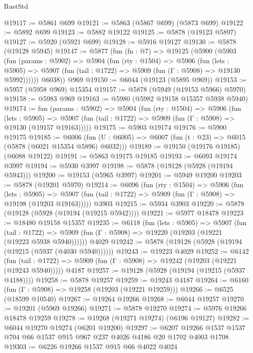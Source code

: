 \begin{lexlean}{RustStd}
\begin{coremodule}
@19117 := @5861 @699
@19121 := @5863 (@5867 @699) (@5873 @699)
@19122 := @5892 @699
@19123 := @5882 @19122
@19125 := @5878 (@19123 @5897)
@19127 := @5920 (@5921 @699)
@19128 := @5916 @19127
@19130 := @5878 (@19128 @5945)
@19147 := @5877
    (fun (fn : @7) =>
    @19125
      (@5900
        (@5903
          (fun (params : @5902) =>
          @5904
            (fun (rty : @1504) =>
            @5906
              (fun (lets : @5905) =>
              @5907 (fun (tail : @1722) => @5909 (fun (Γ : @5908) => @19130 @5992))))))
        @6038))
    @969
@19150 := @6044 (@19123 (@5895 @969))
@19153 := @5957 (@5958 @969) @15354
@19157 := @5878 (@5949 (@19153 @5966) @5970)
@19158 := @5983 @969
@19163 := @5980 (@5982 @19158 @15357 @5938 @5940)
@19174 := fun (params : @5902) =>
  @5904
    (fun (rty : @1504) =>
    @5906
      (fun (lets : @5905) =>
      @5907 (fun (tail : @1722) => @5909 (fun (Γ : @5908) => @19130 (@19157 @19163)))))
@19175 := @5903 @19174
@19176 := @5900 @19175
@19185 := @6006
    (fun (U : @6005) => @6007 (fun (t : @23) => @6015 (@5878 (@6021 @15354 @5896) @6032)))
@19189 := @19150 (@19176 @19185) (@6088 @19122)
@19191 := @5863 @19175 @19185
@19193 := @6093 @19174 @3997
@19194 := @5930 @3997
@19198 := @5878 (@19128 (@5928 (@19194 @5943)))
@19200 := @19153 (@5965 @3997)
@19201 := @5949 @19200
@19203 := @5878 (@19201 @5970)
@19214 := @6096
    (fun (rty : @1504) =>
    @5906
      (fun (lets : @5905) =>
      @5907 (fun (tail : @1722) => @5909 (fun (Γ : @5908) => @19198 (@19203 @19163)))))
    @3903
@19215 := @5934 @3903
@19220 := @5878 (@19128 (@5928 (@19194 (@19215 @5942))))
@19221 := @5977 @18478
@19223 := @18480 @19158 @15357
@19235 := @6118
    (fun (lets : @5905) =>
    @5907
      (fun (tail : @1722) =>
      @5909 (fun (Γ : @5908) => @19220 (@19203 (@19221 (@19223 @5938 @5940))))))
    @4029
@19242 := @5878 (@19128 (@5928 (@19194 (@19215 (@5937 (@4030 @5940))))))
@19243 := @19223 @4029
@19252 := @6142
    (fun (tail : @1722) => @5909 (fun (Γ : @5908) => @19242 (@19203 (@19221 (@19243 @5940)))))
    @4187
@19257 := @19128 (@5928 (@19194 (@19215 (@5937 @4188))))
@19258 := @5878 @19257
@19259 := @19243 @4187
@19264 := @6160 (fun (Γ : @5908) => @19258 (@19203 (@19221 @19259)))
@19266 := @6525 (@18599 @10540)
@19267 := @19264 @19266
@19268 := @6044 @19257
@19270 := @19201 (@5969 @19266)
@19271 := @5878 @19270
@19274 := @5976 @19266 @18478 @19259
@19278 := @19268 (@19271 @19274) (@6196 @19127)
@19282 := @6044 @19270 @19274 (@6201 @19200)
@19297 := @6207 @19266 @1537 @1537 @704 @66 @1537 @915 @967 @237 @4026 @4186 @20 @1702 @4003 @1708
@19303 := @6226 @19266 @1537 @915 @66 @4022 @4024

\end{coremodule}
\end{lexlean}
